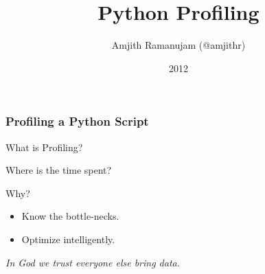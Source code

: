 \documentclass[c,english]{beamer}
\providecommand*{\DUroletitlereference}[1]{\textsl{#1}}
\begin{document}
\title[Python Profiling]{Python Profiling%
  \label{python-profiling}}
\author[Amjith Ramanujam (@amjithr)]{Amjith Ramanujam (@amjithr)}
\date{2012}
\maketitle















\begin{frame}[fragile]
\frametitle{Profiling a Python Script}


\begin{block}{ What is Profiling? }

Where is the time spent?

\end{block}

\pause

\begin{block}{ Why? }
\begin{itemize}

\item Know the bottle-necks.

\item Optimize intelligently.
\end{itemize}

\end{block}

\DUroletitlereference{In God we trust everyone else bring data.}
\end{frame}
\end{document}
